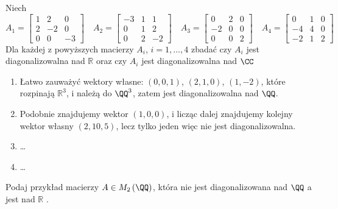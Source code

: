 \documentclass[11pt]{scrartcl}
\begin{document}
   \begin{zadanie}
       Niech
       \[
           A_{1} = 
           \begin{bmatrix}
             1 & 2 & 0 \\
             2 & -2 & 0\\
             0 & 0 & -3
           \end{bmatrix}
           \quad 
           A_{2} = 
           \begin{bmatrix}
             -3 & 1 & 1 \\
             0 & 1 & 2 \\
             0 & 2 & -2
           \end{bmatrix}
           \quad 
           A_{3} = 
           \begin{bmatrix}
             0 & 2 & 0 \\
             -2 & 0 & 0 \\
             0 & 0 & 2
           \end{bmatrix}
           \quad 
           A_{4} = 
           \begin{bmatrix}
             0 & 1 & 0 \\
             -4 & 4 & 0 \\
             -2 & 1 &2
           \end{bmatrix}
       \]
       Dla każdej z powyższych macierzy $A_i$, $i = 1, \dots ,4$ zbadać czy $A_i$ jest diagonalizowalna nad $\mathbb{R} $ oraz czy $A_i$ jest diagonalizowalna nad $\CC$
   \end{zadanie}
   \begin{enumerate}
       \item Łatwo zauważyć wektory własne: $\left ( 0,0,1 \right )$, $\left ( 2,1,0 \right )$, $\left ( 1, -2 \right )$, które rozpinają $\mathbb{R}^3$, i należą do $\QQ^3$, zatem jest diagonalizowalna nad $\QQ$.
       \item Podobnie znajdujemy wektor $\left ( 1, 0, 0 \right )$, i licząc dalej znajdujemy kolejny wektor własny $\left ( 2, 10, 5 \right )$, lecz tylko jeden więc nie jest diagonalizowalna.
        \item \dots 
        \item \dots
   \end{enumerate}
   

   \begin{zadanie}
       Podaj przykład macierzy $A \in M_2 \left ( \QQ \right )$, która nie jest diagonalizowana nad $\QQ$ a jest nad $\mathbb{R}$ .
   \end{zadanie}
\end{document}
